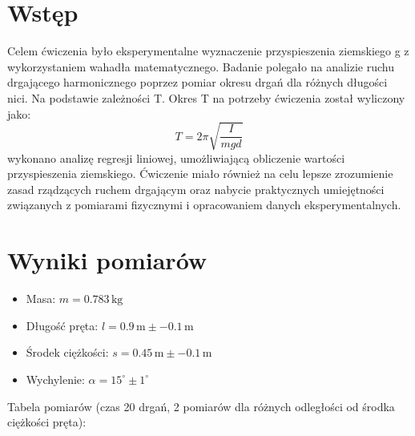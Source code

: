 \documentclass[12pt]{article}
\begin{document}
\section*{Wstęp}

Celem ćwiczenia było eksperymentalne wyznaczenie przyspieszenia ziemskiego g z wykorzystaniem wahadła matematycznego. 
Badanie polegało na analizie ruchu drgającego harmonicznego poprzez pomiar okresu drgań dla różnych długości nici. 
Na podstawie zależności T. Okres T na potrzeby ćwiczenia został wyliczony jako: \[ T = 2\pi \sqrt{\frac{I}{mgd}} \] wykonano analizę regresji liniowej, 
umożliwiającą obliczenie wartości przyspieszenia ziemskiego.
Ćwiczenie miało również na celu lepsze zrozumienie zasad rządzących ruchem drgającym 
oraz nabycie praktycznych umiejętności związanych z pomiarami fizycznymi i opracowaniem danych eksperymentalnych.

\section*{Wyniki pomiarów}

\begin{itemize}
    \item Masa: \( m = 0.783 \, \text{kg} \)
    \item Długość pręta: \( l = 0.9 \, \text{m} \pm -0.1 \, \text{m} \)
    \item Środek ciężkości: \( s = 0.45 \, \text{m} \pm -0.1 \, \text{m} \)
    \item Wychylenie: \( \alpha = 15^\circ \pm 1^\circ \)
\end{itemize}

Tabela pomiarów (czas 20 drgań, 2 pomiarów dla różnych odległości od środka ciężkości pręta):
\end{document}

